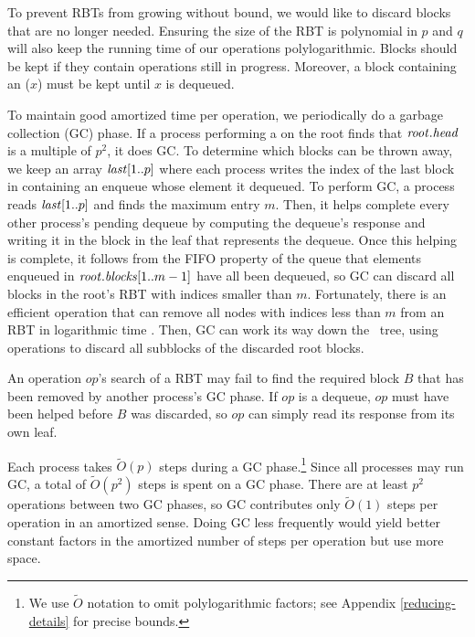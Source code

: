 To prevent RBTs from growing without bound, we would like to discard
blocks that are no longer needed.
Ensuring the size of the RBT is polynomial in $p$ and $q$ will 
also keep the running time of our operations polylogarithmic.
Blocks should be kept if they contain operations still in progress.
Moreover, a block containing an ($x$) must be kept until $x$ is dequeued.

To maintain good amortized time per operation, we periodically do a garbage collection (GC) phase.
If a process performing a  on the root finds that $\mbox{\textnormal{\textit{root}}}.\mbox{\textit{head}}$ is a multiple
of $p^2$, it does GC.
To determine which blocks can be thrown away, we keep an array $\mbox{\textnormal{\textit{last}}}[1..p]$ where 
each process writes the index of the last block in
 containing an enqueue whose element it dequeued.
To perform GC, a process reads $\mbox{\textnormal{\textit{last}}}[1..p]$ and finds the maximum entry $m$.
Then, it helps complete every other process's pending dequeue 
by computing the dequeue's response and writing it in the block in the leaf that represents the dequeue.
Once this helping is complete, it follows from the FIFO property of the queue that elements enqueued 
in $\mbox{\textnormal{\textit{root}}}.\mbox{\textit{blocks}}[1..m-1]$ have all been dequeued, so GC can discard all blocks in the root's RBT 
with indices smaller than $m$.
Fortunately, there is an efficient  operation that can remove
all nodes with indices less than $m$ from an RBT in logarithmic time \cite[Sec.~4.2]{Tar83}.
Then, GC can work its way down the \ordering\ tree, using  operations to discard all subblocks
of the discarded root blocks.


An operation $op$'s search of a RBT may fail to find the required block $B$ that has been removed 
by another process's GC phase.  If $op$
is a dequeue, $op$ must have been helped before $B$ was discarded, so $op$ can simply read its response from
its own leaf.

Each process takes $\tilde{O}(p)$ steps during a GC phase.\footnote{We use $\tilde{O}$ notation
to omit polylogarithmic factors; see Appendix \ref{reducing-details} for precise bounds.}
Since all processes may run GC,
a total of $\tilde{O}(p^2)$ steps is spent on a GC phase.
There are at least $p^2$ operations between two GC phases,  so
GC contributes only $\tilde{O}(1)$ steps per operation in an amortized sense.
Doing GC less frequently would yield better constant factors in the amortized number of steps per operation but use more space.

